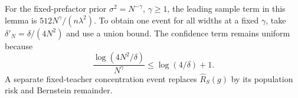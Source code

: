 For the fixed-prefactor prior $\sigma^2=N^{-\gamma}$, $\gamma\geq1$,
the leading sample term in this lemma is
$512N^\gamma/(n\lambda^2)$.  To obtain one event for all widths at a
fixed $\gamma$, take $\delta'_N=\delta/(4N^2)$ and use a union bound.
The confidence term remains uniform because
\[
 \frac{\log(4N^2/\delta)}{N^\gamma}
       \leq\log(4/\delta)+1.
\]
A separate fixed-teacher concentration event replaces
$\widehat R_S(g)$ by its population risk and Bernstein remainder.
